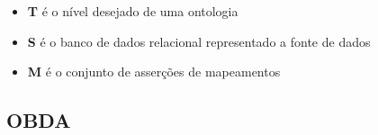 \begin{itemize}

    \item \textbf{T} é o nível desejado de uma ontologia
    
    \item \textbf{S} é o banco de dados relacional representado a fonte de dados
    
    \item \textbf{M} é o conjunto de asserções de mapeamentos

\end{itemize}

\subsection{OBDA}
\label{sec:obda}
